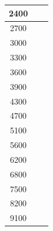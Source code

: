 \documentclass{llncs}
\begin{document}
\begin{longtable}{|c|c|c|}
			2400                     &                                                   &                                                      \\ \hline
			2700                     &                                                   &                                                      \\ \hline
			3000                     &                                                   &                                                      \\ \hline
			3300                     &                                                   &                                                      \\ \hline
			3600                     &                                                   &                                                      \\ \hline
			3900                     &                                                   &                                                      \\ \hline
			4300                     &                                                   &                                                      \\ \hline
			4700                     &                                                   &                                                      \\ \hline
			5100                     &                                                   &                                                      \\ \hline
			5600                     &                                                   &                                                      \\ \hline
			6200                     &                                                   &                                                      \\ \hline
			6800                     &                                                   &                                                      \\ \hline
			7500                     &                                                   &                                                      \\ \hline
			8200                     &                                                   &                                                      \\ \hline
			9100                     &                                                   &                                                      \\ \hline

\end{longtable}
\end{document}

